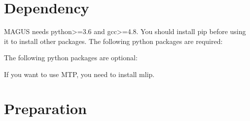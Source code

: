 \documentclass[12pt,oneside]{book}
\begin{document}
\section{Dependency}
MAGUS needs python>=3.6 and gcc>=4.8. You should install pip before using it to install other packages. The following python packages are required:


The following python packages are optional:


If you want to use MTP, you need to install mlip.


\section{Preparation}
\end{document}
